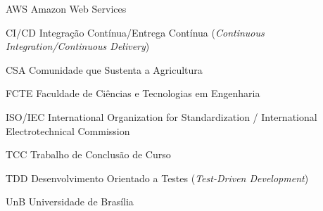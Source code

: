 \begin{siglas}
  \item[AWS] Amazon Web Services
  \item[CI/CD] Integração Contínua/Entrega Contínua (\textit{Continuous Integration/Continuous Delivery})
  \item[CSA] Comunidade que Sustenta a Agricultura
  \item[FCTE] Faculdade de Ciências e Tecnologias em Engenharia
  \item[ISO/IEC] International Organization for Standardization / International Electrotechnical Commission
  \item[TCC] Trabalho de Conclusão de Curso
  \item[TDD] Desenvolvimento Orientado a Testes (\textit{Test-Driven Development})
  \item[UnB] Universidade de Brasília
\end{siglas}
